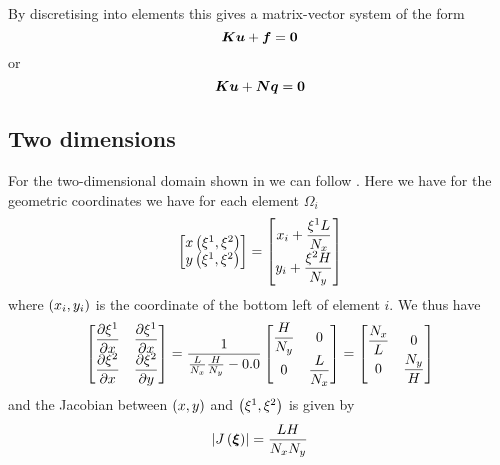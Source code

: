 By discretising into elements this gives a matrix-vector system of the form
\begin{equation}
  \matr{K}\vect{u}+\vect{f}=\vect{0}
\end{equation}
or
\begin{equation}
  \matr{K}\vect{u}+\matr{N}\vectr{q}=\vect{0}
\end{equation}

\subsection{Two dimensions}
\label{subsec:ElementStiffnessMatrixLaplace2D}

For the two-dimensional domain shown in
 we can follow
. Here we have for the geometric
coordinates we have for each element $\Omega_{i}$
\begin{equation}
  \begin{bmatrix}
     x\left( \xi^{1},\xi^{2} \right)  \\
     y\left( \xi^{1},\xi^{2} \right) 
  \end{bmatrix}= \begin{bmatrix}
    x_{i}+\dfrac{\xi^{1} L}{N_{x}} \\
    y_{i}+\dfrac{\xi^{2} H}{N_{y}}  
  \end{bmatrix}
\end{equation}
where $\left( x_{i},y_{i} \right)$ is the coordinate of the bottom left of element $i$. We thus have 
\begin{equation}
  \begin{bmatrix}
     \dfrac{\partial \xi^{1}}{\partial x}  &  \dfrac{\partial \xi^{1}}{\partial x}  \\
     \dfrac{\partial \xi^{2}}{\partial x}  &  \dfrac{\partial \xi^{2}}{\partial y}          
  \end{bmatrix} = \dfrac{1}{\frac{L}{N_{x}}\frac{H}{N_{y}}-0.0} \begin{bmatrix}
    \dfrac{H}{N_{y}} & 0 \\
    0 & \dfrac{L}{N_{x}}
  \end{bmatrix} = \begin{bmatrix}
    \dfrac{N_{x}}{L} & 0 \\
    0 & \dfrac{N_{y}}{H}
  \end{bmatrix}
\end{equation}
and the Jacobian between $\left( x,y \right)$ and $\left( \xi^{1},\xi^{2} \right)$ is given by
\begin{equation}
  \left|  J\left(  \boldsymbol{\xi}  \right)  \right|=\dfrac{LH}{N_{x}N_{y}}
\end{equation}

